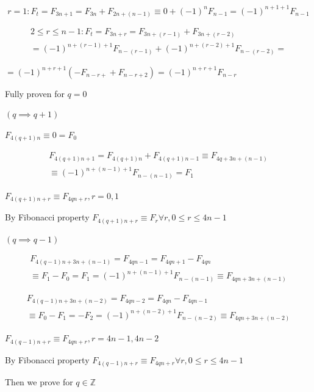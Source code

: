 \documentclass{article}
\begin{document}
\[ r = 1: F_{t}=F_{3n+1} = F_{3n} + F_{2n+(n-1)} \equiv 0 + {(-1)}^{n}F_{n-1} = {(-1)}^{n+1+1}F_{n-1} \]

\begin{multline*}
2 \leq r \leq n - 1: F_{t} = F_{3n+r} = F_{3n+(r-1)} + F_{3n+(r-2)} \\
= {(-1)}^{n+(r-1)+1}F_{n-(r-1)} + {(-1)}^{n+(r-2)+1}F_{n-(r-2)} =
\end{multline*}

\( = {(-1)}^{n+r+1}(-F_{n-r+} + F_{n-r+2}) = {(-1)}^{n+r+1}F_{n-r} \)

Fully proven for \( q = 0 \)

\( (q \implies q + 1) \)

\( F_{4(q+1)n} \equiv 0 = F_{0} \)

\begin{multline*}
F_{4(q+1)n+1} = F_{4(q+1)n} + F_{4(q+1)n - 1} \equiv F_{4q+3n+(n-1)} \\
\equiv {(-1)}^{n+(n-1)+1}F_{n-(n-1)} = F_{1}
\end{multline*}

\( F_{4(q+1)n+r} \equiv F_{4qn+r}, r = 0, 1 \)

By Fibonacci property \( F_{4(q+1)n+r} \equiv F_{r} \forall r, 0 \leq r \leq 4n -1 \)

\( (q \implies q - 1) \)

\begin{multline*}
F_{4(q-1)n + 3n + (n-1)} = F_{4qn - 1} = F_{4qn+1} - F_{4qn} \\
\equiv F_{1} - F_{0} = F_{1} = {(-1)}^{n+(n-1)+1}F_{n-(n-1)} \equiv F_{4qn + 3n + (n-1)}
\end{multline*}

\begin{multline*}
F_{4(q-1)n + 3n + (n-2)} = F_{4qn - 2} = F_{4qn} - F_{4qn-1} \\
\equiv F_{0} - F_{1} = -F_{2} = {(-1)}^{n+(n-2)+1}F_{n-(n-2)} \equiv F_{4qn + 3n + (n-2)}
\end{multline*}

\( F_{4(q-1)n + r} \equiv F_{4qn + r}, r = 4n-1, 4n-2 \)

By Fibonacci property \( F_{4(q-1)n+r} \equiv F_{4qn + r} \forall r, 0 \leq r \leq 4n - 1 \)

Then we prove for \( q \in \mathbb{Z} \)
\end{document}

